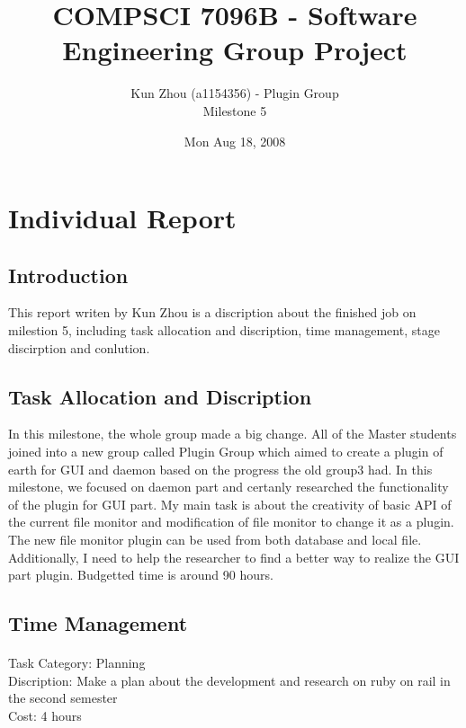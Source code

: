 \documentclass[10pt,a4,oneside]{article}
\begin{document}
\title{COMPSCI 7096B - Software Engineering Group Project}
\author{Kun Zhou (a1154356) - Plugin Group\\ Milestone 5}
\date{Mon Aug 18, 2008}

\maketitle

\section*{Individual Report}


\subsection*{Introduction}

This report writen by Kun Zhou is a discription about the finished job on milestion 5, including task allocation and discription, time management, stage discirption and conlution. 


\paragraph{}

\subsection*{Task Allocation and Discription}

In this milestone, the whole group made a big change. All of the Master students joined into a new group called Plugin Group which aimed to create a plugin of earth for GUI and daemon based on the progress the old group3 had. In this milestone, we focused on daemon part and certanly researched the functionality of the plugin for GUI part. My main task is about the creativity of basic API of the current file monitor and modification of file monitor to change it as a plugin. The new file monitor plugin can be used from both database and local file. Additionally, I need to help the researcher to find a better way to realize the GUI part plugin. Budgetted time is around 90 hours.


\subsection*{Time Management}

\paragraph{}
Task Category: Planning  \\
Discription: Make a plan about the development and research on ruby on rail in the second semester \\
Cost: 4 hours\\
\end{document}
